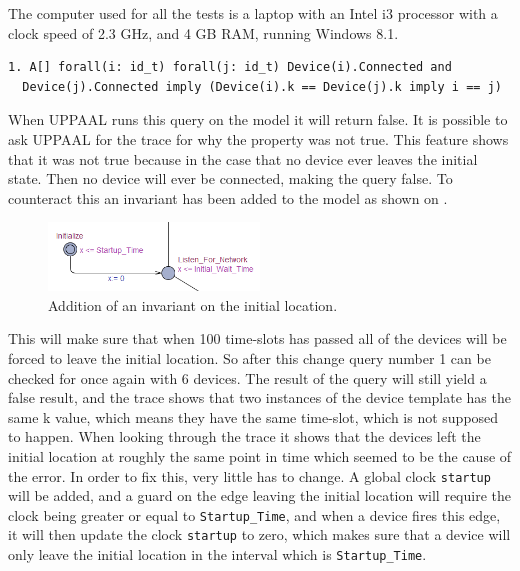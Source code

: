 The computer used for all the tests is a laptop with an Intel i3 processor with a clock speed of 2.3 GHz, and 4 GB RAM, running Windows 8.1.

\begin{lstlisting}[style=UPPAAL, title={This query requires that if all devices are connected, then no pair of devices have the same \texttt{k}, unless the pair consists of the same two devices.}]
1. A[] forall(i: id_t) forall(j: id_t) Device(i).Connected and
  Device(j).Connected imply (Device(i).k == Device(j).k imply i == j)
\end{lstlisting}

\noindent
When UPPAAL runs this query on the model it will return false.
It is possible to ask UPPAAL for the trace for why the property was not true.
This feature shows that it was not true because in the case that no device ever leaves the initial state. 
Then no device will ever be connected, making the query false.
To counteract this an invariant has been added to the model as shown on .

\begin{figure}
  \vspace{-10pt}
  \includegraphics[width=0.5\textwidth]{Figures/Model/InvariantOnStartup.PNG} 
\caption{Addition of an invariant on the initial location.}
\label{UPPAALInvariant}
\end{figure}

This will make sure that when 100 time-slots has passed all of the devices will be forced to leave the initial location.
So after this change query number 1 can be checked for once again with 6 devices.
The result of the query will still yield a false result, and the trace shows that two instances of the device template has the same k value, which means they have the same time-slot, which is not supposed to happen.
When looking through the trace it shows that the devices left the initial location at roughly the same point in time which seemed to be the cause of the error.
In order to fix this, very little has to change.
A global clock \texttt{startup} will be added, and a guard on the edge leaving the initial location will require the clock being greater or equal to \texttt{Startup\_Time}, and when a device fires this edge, it will then update the clock \texttt{startup} to zero, which makes sure that a device will only leave the initial location in the interval which is \texttt{Startup\_Time}.

